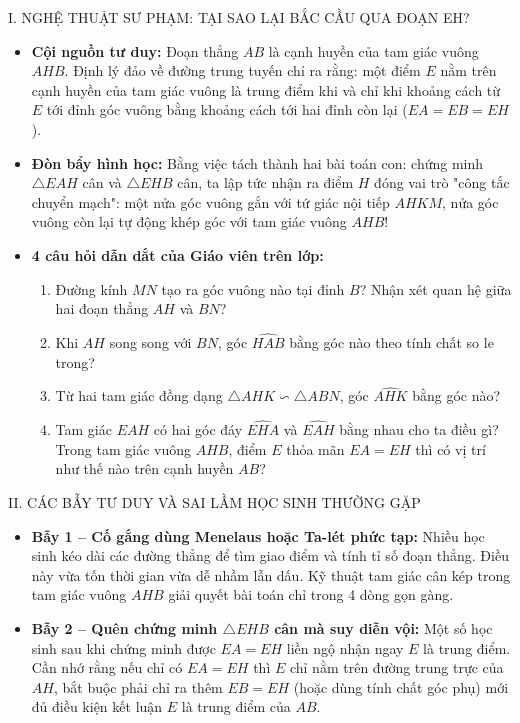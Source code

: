 \documentclass[11pt,a4paper]{article}
\begin{document}
\begin{pedagogybox}{I. NGHỆ THUẬT SƯ PHẠM: TẠI SAO LẠI BẮC CẦU QUA ĐOẠN EH?}
\begin{itemize}[leftmargin=*]
    \item \textbf{Cội nguồn tư duy:} Đoạn thẳng $AB$ là cạnh huyền của tam giác vuông $AHB$. Định lý đảo về đường trung tuyến chỉ ra rằng: một điểm $E$ nằm trên cạnh huyền của tam giác vuông là trung điểm khi và chỉ khi khoảng cách từ $E$ tới đỉnh góc vuông bằng khoảng cách tới hai đỉnh còn lại ($EA = EB = EH$).
    \item \textbf{Đòn bẩy hình học:} Bằng việc tách thành hai bài toán con: chứng minh $\triangle EAH$ cân và $\triangle EHB$ cân, ta lập tức nhận ra điểm $H$ đóng vai trò "công tắc chuyển mạch": một nửa góc vuông gắn với tứ giác nội tiếp $AHKM$, nửa góc vuông còn lại tự động khép góc với tam giác vuông $AHB$!
    \item \textbf{4 câu hỏi dẫn dắt của Giáo viên trên lớp:}
    \begin{enumerate}[label=\arabic*., nosep]
        \item Đường kính $MN$ tạo ra góc vuông nào tại đỉnh $B$? Nhận xét quan hệ giữa hai đoạn thẳng $AH$ và $BN$?
        \item Khi $AH$ song song với $BN$, góc $\widehat{HAB}$ bằng góc nào theo tính chất so le trong?
        \item Từ hai tam giác đồng dạng $\triangle AHK \backsim \triangle ABN$, góc $\widehat{AHK}$ bằng góc nào?
        \item Tam giác $EAH$ có hai góc đáy $\widehat{EHA}$ và $\widehat{EAH}$ bằng nhau cho ta điều gì? Trong tam giác vuông $AHB$, điểm $E$ thỏa mãn $EA = EH$ thì có vị trí như thế nào trên cạnh huyền $AB$?
    \end{enumerate}
\end{itemize}
\end{pedagogybox}

\vspace{1mm}

\begin{pedagogybox}{II. CÁC BẪY TƯ DUY VÀ SAI LẦM HỌC SINH THƯỜNG GẶP}
\begin{itemize}[leftmargin=*, nosep]
    \item \textbf{Bẫy 1 -- Cố gắng dùng Menelaus hoặc Ta-lét phức tạp:} Nhiều học sinh kéo dài các đường thẳng để tìm giao điểm và tính tỉ số đoạn thẳng. Điều này vừa tốn thời gian vừa dễ nhầm lẫn dấu. Kỹ thuật tam giác cân kép trong tam giác vuông $AHB$ giải quyết bài toán chỉ trong 4 dòng gọn gàng.
    \item \textbf{Bẫy 2 -- Quên chứng minh $\triangle EHB$ cân mà suy diễn vội:} Một số học sinh sau khi chứng minh được $EA = EH$ liền ngộ nhận ngay $E$ là trung điểm. Cần nhớ rằng nếu chỉ có $EA = EH$ thì $E$ chỉ nằm trên đường trung trực của $AH$, bắt buộc phải chỉ ra thêm $EB = EH$ (hoặc dùng tính chất góc phụ) mới đủ điều kiện kết luận $E$ là trung điểm của $AB$.
\end{itemize}
\end{pedagogybox}
\end{document}
